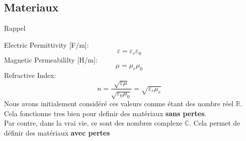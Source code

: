 \subsection[5min-Max]{Materiaux }
\maxbackground
\begin{comment}
\begin{frame}{Plan}
    \begin{makelist}[\small][1.5]
        \icon[red]{\faTimes} & Complex $\epsilon$ \& $\mu$ \\
        \icon[red]{\faTimes} & Complex Refractive index\\
        \icon[red]{\faTimes} & Losses in dB\\
    \end{makelist}
\end{frame}
\end{comment}
\begin{frame}{Rappel}
    \begin{twocolumns}[0.4]
        \leftcol
            Electric Permittivity [F/m]:
            \begin{equation*}
                \varepsilon =\varepsilon_r \varepsilon_0
            \end{equation*}
            Magnetic Permeabililty [H/m]:
            \begin{equation*}
                \mu =\mu_r \mu_0
            \end{equation*}
            Refractive Index:
            \begin{equation*}
                n =\frac{\sqrt{\varepsilon \mu}}{\sqrt{\varepsilon_0 \mu_0}} = \sqrt{\varepsilon_r \mu_r}
            \end{equation*}
        \rightcol
            Nous avons initialement considéré ces valeurs comme étant des nombre réel $\mathbb{R}$.\\
            \vspace{10pt}
            Cela fonctionne tres bien pour definir des matériaux \textbf{sans pertes}.\\
            \vspace{10pt}
            Par contre, dans la vrai vie, ce sont des nombres complexe $\mathbb{C}$. Cela permet de définir des matériaux \textbf{avec pertes}
    \end{twocolumns}
\end{frame}

